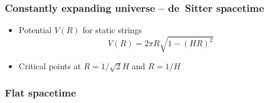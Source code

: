\documentclass[11pt]{beamer}
\newcommand{\lp}{\left(}
\newcommand{\rp}{\right)}
\begin{document}
\begin{frame}
\frametitle{Constantly expanding universe -- de~Sitter spacetime}
\begin{itemize}
	\item Potential $V(R)$ for static strings		
	$$
	V(R) = 2 \pi R \sqrt{1- \lp H R \rp ^2}
	$$
	\item Critical points at $R = 1/\sqrt{2}H$ and $ R = 1/H$
\end{itemize}
\end{frame}


\begin{frame}[plain]
		\vspace*{0.1cm}\hspace*{-1.1cm}
\end{frame}


\begin{frame}
\frametitle{Flat spacetime}
\vspace*{0.05cm}\hspace*{-0.2cm}
\end{frame}
\end{document}
